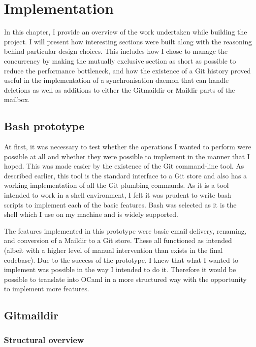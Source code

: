 \chapter{Implementation}

In this chapter, I provide an overview of the work undertaken while building the project. I will present how interesting sections were built along with the reasoning behind particular design choices. This includes how I chose to manage the concurrency by making the mutually exclusive section as short as possible to reduce the performance bottleneck, and how the existence of a Git history proved useful in the implementation of a synchronisation daemon that can handle deletions as well as additions to either the Gitmaildir or Maildir parts of the mailbox.

\section{Bash prototype}

At first, it was necessary to test whether the operations I wanted to perform were possible at all and whether they were possible to implement in the manner that I hoped. This was made easier by the existence of the Git command-line tool. As described earlier, this tool is the standard interface to a Git store and also has a working implementation of all the Git plumbing commands. As it is a tool intended to work in a shell environment, I felt it was prudent to write bash scripts to implement each of the basic features. Bash was selected as it is the shell which I use on my machine and is widely supported.

The features implemented in this prototype were basic email delivery, renaming, and conversion of a Maildir to a Git store. These all functioned as intended (albeit with a higher level of manual intervention than exists in the final codebase). Due to the success of the prototype, I knew that what I wanted to implement was possible in the way I intended to do it. Therefore it would be possible to translate into OCaml in a more structured way with the opportunity to implement more features.

\section{Gitmaildir}

\subsection{Structural overview} \label{section:structuraloverview}

